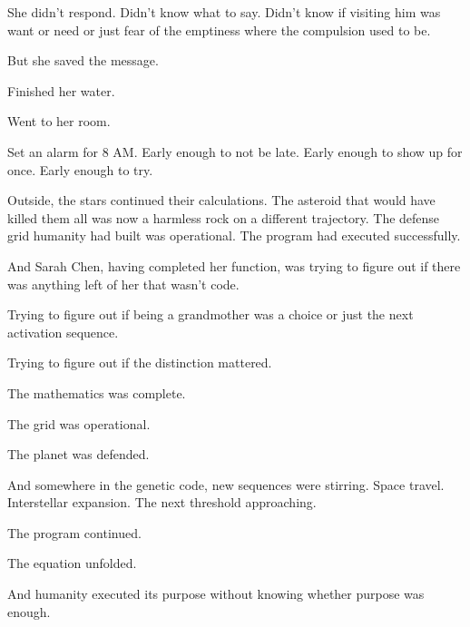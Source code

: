 She didn't respond. Didn't know what to say. Didn't know if visiting him was want or need or just fear of the emptiness where the compulsion used to be.

But she saved the message.

Finished her water.

Went to her room.

Set an alarm for 8 AM. Early enough to not be late. Early enough to show up for once. Early enough to try.

Outside, the stars continued their calculations. The asteroid that would have killed them all was now a harmless rock on a different trajectory. The defense grid humanity had built was operational. The program had executed successfully.

And Sarah Chen, having completed her function, was trying to figure out if there was anything left of her that wasn't code.

Trying to figure out if being a grandmother was a choice or just the next activation sequence.

Trying to figure out if the distinction mattered.

The mathematics was complete.

The grid was operational.

The planet was defended.

And somewhere in the genetic code, new sequences were stirring. Space travel. Interstellar expansion. The next threshold approaching.

The program continued.

The equation unfolded.

And humanity executed its purpose without knowing whether purpose was enough.

